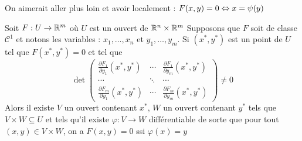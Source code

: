 On aimerait aller plus loin et avoir localement :
$F(x,y) = 0 \Leftrightarrow x = \psi(y)$
\begin{theoreme}
    Soit $F:U\to\mathbb{R}^m$ où $U$ est un ouvert de $\mathbb{R}^n\times\mathbb{R}^m$
    Supposons que $F$ soit de classe $\mathcal C ^1$ et notons les variables :
    $x_1,\dotsc,x_n$ et $y_1,\dotsc,y_m$.
    Si $(x^*,y^*)$ est un point de $U$ tel que $F(x^*,y^*)=0$
    et tel que $$\det \begin{pmatrix}
    \frac{\partial F_1}{\partial y_1}(x^*,y^*) & \cdots & \frac{\partial F_1}{\partial y _m}(x^*,y^*) \\
    \cdots & \ddots& \cdots \\
    \frac{\partial F_m}{\partial y_1}(x^*,y^*) & \cdots & \frac{\partial F_m}{\partial y_m}(x^*,y^*)
    \end{pmatrix} \ne 0$$
    Alors il existe $V$ un ouvert contenant $x^*$, $W$ un ouvert contenant $y^*$ tels que $V\times W\subseteq U$ et tels qu'il existe $\varphi:V\to W$ différentiable de sorte que pour tout $(x,y)\in V\times W$, on a $F(x,y) = 0$ ssi $\varphi(x) = y$
\end{theoreme}

